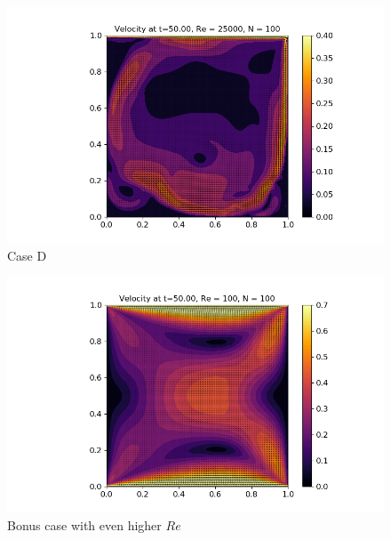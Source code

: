 \documentclass[10pt]{report}
\begin{document}
\begin{figure}[H]
    \centering
    \includegraphics[width = \textwidth]{plots/velocity_D.png}
    \caption{Case D}
    \label{caseD1}
\end{figure}
\begin{figure}[H]
    \centering
    \includegraphics[width = \textwidth]{plots/velocity_D1.png}
    \caption{Bonus case with even higher $Re$}
    \label{caseD}
\end{figure}
\end{document}
